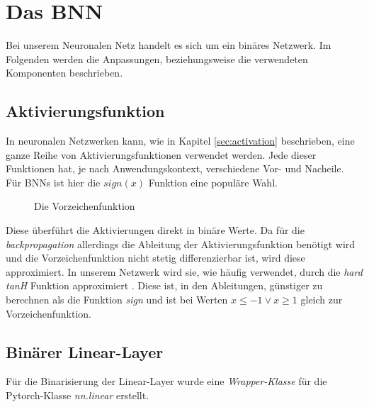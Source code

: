 \chapter{Das BNN}
Bei unserem Neuronalen Netz handelt es sich um ein binäres Netzwerk. Im Folgenden werden die Anpassungen, beziehungsweise die verwendeten Komponenten beschrieben.
\section{Aktivierungsfunktion}
In neuronalen Netzwerken kann, wie in Kapitel \ref{sec:activation} beschrieben, eine ganze Reihe von Aktivierungsfunktionen verwendet werden. Jede dieser Funktionen hat, je nach Anwendungskontext, verschiedene Vor- und Nacheile.\\
Für BNNs ist hier die $sign(x)$ Funktion eine populäre Wahl.
\begin{figure}[h]
	\centering
	\caption{Die Vorzeichenfunktion}
	\label{fig:sign}
\end{figure} 
Diese überführt die Aktivierungen direkt in binäre Werte. Da für die \textit{backpropagation} allerdings die Ableitung der Aktivierungsfunktion benötigt wird und die Vorzeichenfunktion nicht stetig differenzierbar ist, wird diese approximiert. In unserem Netzwerk wird sie, wie häufig verwendet, durch die \textit{hard tanH} Funktion approximiert \cite{DBLP:journals/corr/abs-2012-00938}. Diese ist, in den Ableitungen, günstiger zu berechnen als die Funktion \textit{sign} und ist bei Werten $x\leq-1 \vee x \geq 1$ gleich zur Vorzeichenfunktion.
\section{Binärer Linear-Layer}
Für die Binarisierung der Linear-Layer wurde eine \textit{Wrapper-Klasse} für die Pytorch-Klasse \textit{nn.linear} erstellt.

